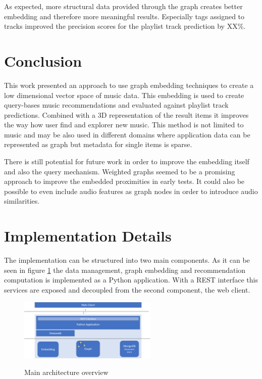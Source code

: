 \documentclass[sigconf]{acmart}
\begin{document}
As expected, more structural data provided through the graph creates better embedding and therefore more meaningful results. Especially tags assigned to tracks improved the precision scores for the playlist track prediction by XX\%. %


\section{Conclusion}
This work presented an approach to use graph embedding techniques to create a low dimensional vector space of music data. This embedding is used to create query-bases music recommendations and evaluated against playlist track predictions. Combined with a 3D representation of the result items it improves the way how user find and explorer new music. 
This method is not limited to music and may be also used in different domains where application data can be represented as graph but metadata for single items is sparse.

There is still potential for future work in order to improve the embedding itself and also the query mechanism.  Weighted graphs seemed to be a promising approach to improve the embedded proximities in early tests. It could also be possible to even include audio features as graph nodes in order to introduce audio similarities.






\newpage
\appendix
\section{Implementation Details}

The implementation can be structured into two main components. As it can be seen in figure \ref{fig:architecture} the data management, graph embedding and recommendation computation is implemented as a Python application. With a REST interface this services are exposed and decoupled from the second component, the web client.

\begin{figure}[ht]
	{\includegraphics[width=250px]{architecture.png}}	
	\caption{Main architecture overview}
	\label{fig:architecture}
\end{figure}
\end{document}
